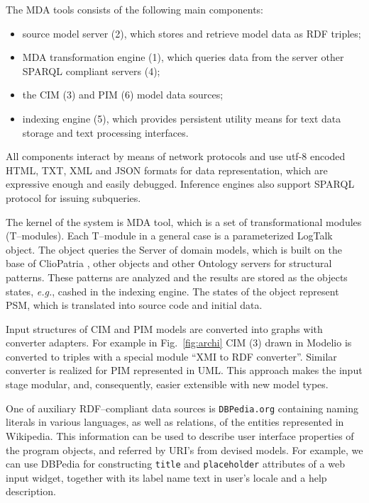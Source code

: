 \documentclass[conference]{IEEEtran} \IEEEoverridecommandlockouts
\begin{document}
The MDA tools consists of the following main components: \begin{itemize} \item source model server (2), which stores and retrieve model data as RDF triples; \item MDA transformation engine (1), which queries data from the server other SPARQL compliant servers (4); \item the CIM (3) and PIM (6) model data sources; \item indexing engine (5), which provides persistent utility means for text data storage and text processing interfaces. \end{itemize} 

All components interact by means of network protocols and use utf-8 encoded HTML, TXT, XML and JSON formats for data representation, which are expressive enough and easily debugged. Inference engines also support SPARQL protocol for issuing subqueries. 

The kernel of the system is MDA tool, which is a set of transformational modules (T--modules). Each T--module in a general case is a parameterized LogTalk object. The object queries the Server of domain models, which is built on the base of ClioPatria \cite{Clio}, other objects and other Ontology servers for structural patterns. These patterns are analyzed and the results are stored as the objects states, \emph{e.g.}, cashed in the indexing engine. The states of the object represent PSM, which is translated into source code and initial data. 

Input structures of CIM and PIM models are converted into graphs with converter adapters. For example in Fig.~\ref{fig:archi} CIM (3) drawn in Modelio \cite{modelio} is converted to triples with a special module ``XMI to RDF converter''. Similar converter is realized for PIM represented in UML. This approach makes the input stage modular, and, consequently, easier extensible with new model types. 

One of auxiliary RDF--compliant data sources is \texttt{DBPedia.org} containing naming literals in various languages, as well as relations, of the entities represented in Wikipedia. This information can be used to describe user interface properties of the program objects, and referred by URI's from devised models. For example, we can use DBPedia for constructing \texttt{title} and \texttt{placeholder} attributes of a web input widget, together with its label name text in user's locale and a help description. 
\end{document}
